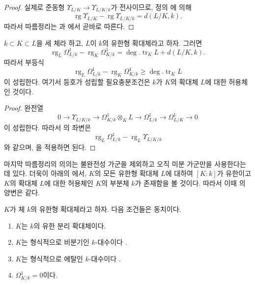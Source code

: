 \begin{proof}
실제로 준동형 $\Upsilon_{L/K}\to\Upsilon_{L/K/k}$가 전사이므로,
정의 에 의해
\[
\operatorname{rg}\Upsilon_{L/K}-\operatorname{rg}\Upsilon_{L/K/k}
=d(L/K,k).
\]
따라서 따름정리는 과 에서
곧바로 따른다.
\end{proof}

\begin{corollary}[21.7.3]
\label{0.21.7.3-ko}
$k\subset K\subset L$을 세 체라 하고, $L$이 $k$의 유한형 확대체라고
하자. 그러면
\begin{equation}
\tag{21.7.3.1}
\label{0.21.7.3.1-ko}
\operatorname{rg}_L\Omega^1_{L/k}-\operatorname{rg}_K\Omega^1_{K/k}
=\deg.\operatorname{tr}_K L+d(L/K,k).
\end{equation}
따라서 부등식
\begin{equation}
\tag{21.7.3.2}
\label{0.21.7.3.2-ko}
\operatorname{rg}_L\Omega^1_{L/k}-\operatorname{rg}_K\Omega^1_{K/k}
\geqslant\deg.\operatorname{tr}_K L
\end{equation}
이 성립한다. 여기서 등호가 성립할 필요충분조건은 $k$가 $K$의
확대체 $L$에 대한 허용체인 것이다.
\end{corollary}

\begin{proof}
완전열 
\[
0\to\Upsilon_{L/K/k}\to\Omega^1_{K/k}\otimes_KL\to\Omega^1_{L/k}
\to\Omega^1_{L/K}\to0
\]
이 성립한다. 따라서 의 좌변은
\[
\operatorname{rg}_L\Omega^1_{L/k}-\operatorname{rg}_L\Upsilon_{L/K/k}
\]
와 같으며, 을 적용하면 된다.
\end{proof}

마지막 따름정리의 의의는 불완전성 가군을 제외하고 오직 미분 가군만을
사용한다는 데 있다. 더욱이 아래의 에서, $K$의 모든
유한형 확대체 $L$에 대하여 $[K:k]$가 유한이고 $K$의 확대체 $L$에
대한 허용체인 $K$의 부분체 $k$가 존재함을 볼 것이다. 따라서 이때
의 양변은 같다.

\begin{corollary}[21.7.4]
\label{0.21.7.4-ko}
$K$가 체 $k$의 유한형 확대체라고 하자. 다음 조건들은 동치이다.
\begin{enumerate}
  \item[\rm a)] $K$는 $k$의 유한 분리 확대체이다.
  \item[\rm b)] $K$는 형식적으로 비분기인 $k$-대수이다
  .
  \item[\rm c)] $K$는 형식적으로 에탈인 $k$-대수이다
  .
  \item[\rm d)] $\Omega^1_{K/k}=0$이다.
\end{enumerate}
\end{corollary}

